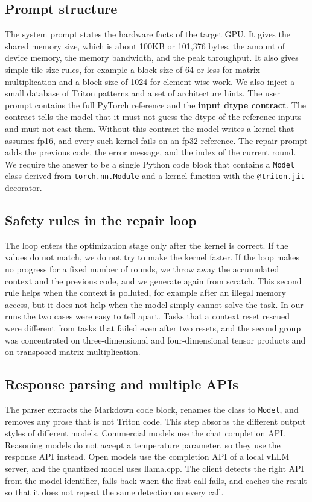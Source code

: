 \subsection{Prompt structure}
The system prompt states the hardware facts of the target GPU. It gives the shared memory size,
which is about 100KB or 101{,}376 bytes, the amount of device memory, the memory bandwidth, and the
peak throughput. It also gives simple tile size rules, for example a block size of 64 or less for
matrix multiplication and a block size of 1024 for element-wise work. We also inject a small
database of Triton patterns and a set of architecture hints. The user prompt contains the full
PyTorch reference and the \textbf{input dtype contract}. The contract tells the model that it must
not guess the dtype of the reference inputs and must not cast them. Without this contract the model
writes a kernel that assumes fp16, and every such kernel fails on an fp32 reference. The repair
prompt adds the previous code, the error message, and the index of the current round. We require the
answer to be a single Python code block that contains a \texttt{Model} class derived from
\texttt{torch.nn.Module} and a kernel function with the \texttt{@triton.jit} decorator.

\subsection{Safety rules in the repair loop}
The loop enters the optimization stage only after the kernel is correct. If the values do not match,
we do not try to make the kernel faster. If the loop makes no progress for a fixed number of rounds,
we throw away the accumulated context and the previous code, and we generate again from scratch.
This second rule helps when the context is polluted, for example after an illegal memory access, but
it does not help when the model simply cannot solve the task. In our runs the two cases were easy to
tell apart. Tasks that a context reset rescued were different from tasks that failed even after two
resets, and the second group was concentrated on three-dimensional and four-dimensional tensor
products and on transposed matrix multiplication.

\subsection{Response parsing and multiple APIs}
The parser extracts the Markdown code block, renames the class to \texttt{Model}, and removes any
prose that is not Triton code. This step absorbs the different output styles of different models.
Commercial models use the chat completion API. Reasoning models do not accept a temperature
parameter, so they use the response API instead. Open models use the completion API of a local vLLM
server, and the quantized model uses llama.cpp. The client detects the right API from the model
identifier, falls back when the first call fails, and caches the result so that it does not repeat
the same detection on every call.

